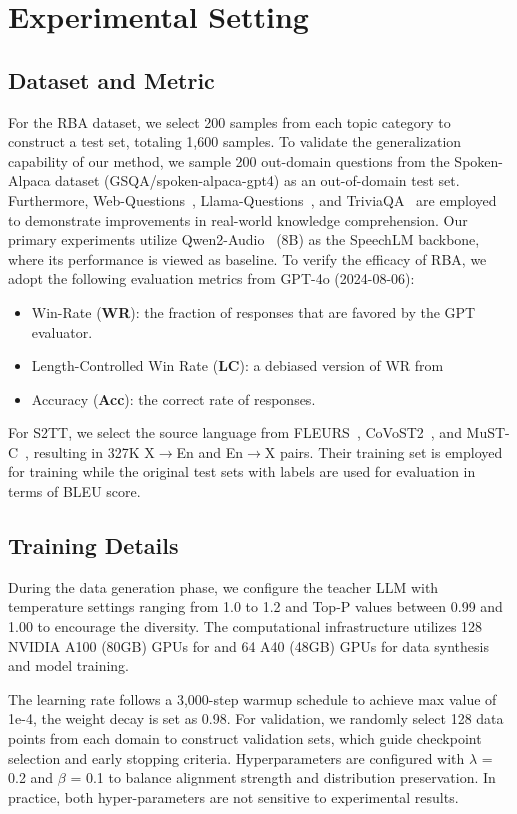 \documentclass[letterpaper]{article} %
\begin{document}
\section{Experimental Setting}
\subsection{Dataset and Metric}
For the RBA dataset, we select 200 samples from each topic category to construct a test set, totaling 1,600 samples. To validate the generalization capability of our method, we sample 200 out-domain questions from the Spoken-Alpaca dataset (GSQA/spoken-alpaca-gpt4) as an out-of-domain test set. Furthermore, Web-Questions~\cite{berant2013semantic}, Llama-Questions~\cite{nachmani2023spoken}, and TriviaQA~\cite{joshi2017triviaqa} are employed to demonstrate improvements in real-world knowledge comprehension.  
Our primary experiments utilize Qwen2-Audio~\cite{chu2024qwen2} (8B) as the SpeechLM backbone, where its performance is viewed as baseline. To verify the efficacy of RBA, we adopt the following evaluation metrics from GPT-4o (2024-08-06):
\begin{itemize}
    \item Win-Rate (\textbf{WR}): the fraction of responses that are favored by the GPT evaluator.
    \item Length-Controlled Win Rate (\textbf{LC}): a debiased version of WR from~\cite{dubois2404length} 
    \item Accuracy (\textbf{Acc}): the correct rate of responses. 
\end{itemize}
For S2TT, we select the source language from FLEURS~\cite{conneau2023fleurs}, CoVoST2~\cite{wang2021covost}, and MuST-C~\cite{di2019must}, resulting in 327K X$\rightarrow$En and En$\rightarrow$X pairs. Their training set is employed for training while the original test sets with labels are used for evaluation in terms of BLEU score. 
\subsection{Training Details}
During the data generation phase, we configure the teacher LLM with temperature settings ranging from 1.0 to 1.2 and Top-P values between 0.99 and 1.00 to encourage the diversity. The computational infrastructure utilizes 128 NVIDIA A100 (80GB) GPUs for and 64 A40 (48GB) GPUs for data synthesis and model training.

The learning rate follows a 3,000-step warmup schedule to achieve max value of 1e-4, the weight decay is set as 0.98. For validation, we randomly select 128 data points from each domain to construct validation sets, which guide checkpoint selection and early stopping criteria. Hyperparameters are configured with $\lambda$ = 0.2 and $\beta$ = 0.1 to balance alignment strength and distribution preservation. In practice, both hyper-parameters are not sensitive to experimental results.
\end{document}
